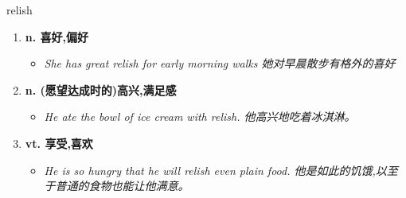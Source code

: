 
\begin{frame}
{\huge relish}
\begin{center}
\begin{enumerate}\Large
  \item \textbf{n. 喜好,偏好}
  \begin{itemize}
    \item \em{\Large{She has great relish for early morning walks 她对早晨散步有格外的喜好}}
  \end{itemize}
  \item \textbf{n. (愿望达成时的)高兴,满足感}
  \begin{itemize}
    \item \em{\Large{He ate the bowl of ice cream with relish. 他高兴地吃着冰淇淋。}}
  \end{itemize}
  \item \textbf{vt. 享受,喜欢}
  \begin{itemize}
    \item \em{\Large{He is so hungry that he will relish even plain food. 他是如此的饥饿,以至于普通的食物也能让他满意。}}
  \end{itemize}
\end{enumerate}
\end{center}
\end{frame}
